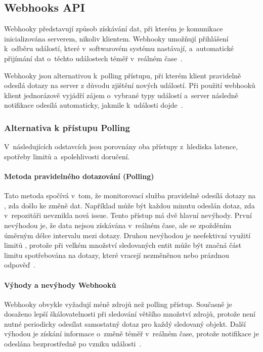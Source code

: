 \subsection{Webhooks API}
\label{subsec:github_api_webhooks}
Webhooky představují způsob získávání dat, při kterém je komunikace inicializována serverem, nikoliv klientem. Webhooky umožňují přihlášení k~odběru událostí, které v~softwarovém systému nastávají, a~automatické přijímání dat o~těchto událostech téměř v~reálném čase~\cite{github_webhooks}.

Webhooky jsou alternativou k~polling přístupu, při kterém klient pravidelně odesílá dotazy na server z důvodu zjištění nových událostí. Při použití webhooků klient jednorázově vyjádří zájem o~vybrané typy událostí a~server následně notifikace odesílá automaticky, jakmile k~události dojde~\cite{github_webhooks}.

\subsubsection*{Alternativa k přístupu Polling}
\label{subsubsec:github_api_webhooks:polling_alternativa}
V~následujících odstavcích jsou porovnány oba přístupy z~hlediska latence, spotřeby \API limitů a~spolehlivosti doručení.

\paragraph*{Metoda pravidelného dotazování (Polling)}
\label{par:github_api_webhooks:polling_metoda}

Tato metoda spočívá v~tom, že monitorovací služba pravidelně odesílá dotazy na \API, zda došlo ke změně dat. Například může být každou minutu odeslán dotaz, zda v~repozitáři nevznikla nová issue. Tento přístup má dvě hlavní nevýhody. První nevýhodou je, že data nejsou získávána v~reálném čase, ale se zpožděním úměrným délce intervalu mezi dotazy. Druhou nevýhodou je neefektivní využití limitů \API, protože při velkém množství sledovaných entit může být značná část limitu spotřebována na dotazy, které vracejí nezměněnou nebo prázdnou odpověď~\cite{github_webhooks}.

\paragraph*{Výhody a nevýhody Webhooků}
\label{par:github_api_webhooks:vyhody_nevyhody}

Webhooky obvykle vyžadují méně zdrojů než polling přístup. Současně je dosaženo lepší škálovatelnosti při sledování většího množství zdrojů, protože není nutné periodicky odesílat samostatný dotaz pro každý sledovaný objekt. Další výhodou je získání informace o~změně téměř v~reálném čase, protože notifikace je odeslána bezprostředně po vzniku události~\cite{github_webhooks}.

